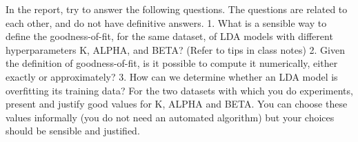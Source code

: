 \documentclass[11pt,a4paper,oneside]{article}
\begin{document}
In the report, try to answer the following questions. The questions are related to each other, and do not have definitive answers.
1. What is a sensible way to define the goodness-of-fit, for the same dataset, of LDA models with different hyperparameters K, ALPHA, and BETA? (Refer to tips in class notes)
2. Given the definition of goodness-of-fit, is it possible to compute it numerically, either exactly or approximately?
3. How can we determine whether an LDA model is overfitting its training data?
For the two datasets with which you do experiments, present and justify good values for K, ALPHA and BETA. You can choose these values informally (you do not need an automated algorithm) but your choices should be sensible and justified.



\end{document}
